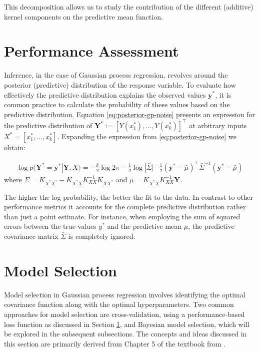 This decomposition allows us to study
the contribution of the different (additive) kernel components on the predictive mean function.


\section{Performance Assessment}\label{sec:performance-assessment}
Inference, in the case of Gaussian process regression, revolves around the posterior (predictive) distribution
of the response variable.
To evaluate how effectively the predictive distribution explains the observed values
$\mathbf{y^{\ast}}$,
it is common practice to calculate the probability of these values based on the predictive distribution.
Equation \ref{eq:posterior-gp-noise} presents an expression for the predictive distribution of
$\mathbf{Y^{\ast}}:= [Y(x_1^{\ast}), \dots, Y(x_k^{\ast})]^{\top}$ at arbitrary inputs
$X^{\ast} = [x_1^{\ast}, \dots, x_k^{\ast}]$.
Expanding the expression from \ref{eq:posterior-gp-noise} we obtain:

\begin{gather}\label{eq:predictive-dist}
    \log p(\mathbf{Y^{\ast}} = \mathbf{y^{\ast}}| \mathbf{Y}, X) =
    -\frac{k}{2} \log 2 \pi - \frac{1}{2} \log|\bar{\Sigma}| -
        \frac{1}{2}(\mathbf{y^{\ast}} - \bar{\mu})^{\top} \bar{\Sigma}^{-1} (\mathbf{y^{\ast}} - \bar{\mu})
\end{gather}
where
$\bar{\Sigma} = K_{X^{\ast}X^{\ast}} - K_{X^{\ast}X} K_{XX}^{-1} K_{XX^{\ast}}$
and $\bar{\mu} = K_{X^{\ast}X} K_{XX}^{-1} \mathbf{Y}$.

The higher the log probability, the better the fit to the data.
In contrast to other performance metrics it accounts for the complete predictive
distribution rather than just a point estimate.
For instance, when employing the sum of squared errors between the true values $y^{\ast}$ and the predictive mean
$\bar{\mu}$, the predictive covariance matrix $\bar{\Sigma}$ is completely ignored.

\section{Model Selection}

Model selection in Gaussian process regression involves identifying the optimal covariance function
along with the optimal hyperparameters.
Two common approaches for model selection are cross-validation, using a performance-based loss
function as discussed in Section \ref{sec:performance-assessment}, and Bayesian model selection,
which will be explored in the subsequent subsections.
The concepts and ideas discussed in this section are primarily derived from Chapter 5 of
the textbook from \citeauthor{rasmussen_gaussian_2006}.

